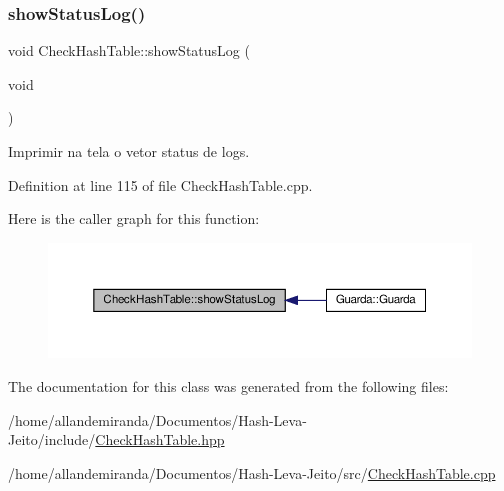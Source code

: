 \subsubsection{\texorpdfstring{show\+Status\+Log()}{showStatusLog()}}
{\footnotesize\ttfamily void Check\+Hash\+Table\+::show\+Status\+Log (\begin{DoxyParamCaption}\item[{void}]{ }\end{DoxyParamCaption})}



Imprimir na tela o vetor status de logs. 



Definition at line 115 of file Check\+Hash\+Table.\+cpp.

Here is the caller graph for this function\+:
\nopagebreak
\begin{figure}[H]
\begin{center}
\leavevmode
\includegraphics[width=350pt]{dc/d2a/class_check_hash_table_a976b114162765decaa1c7fe0b8e16cf8_icgraph}
\end{center}
\end{figure}


The documentation for this class was generated from the following files\+:\begin{DoxyCompactItemize}
\item 
/home/allandemiranda/\+Documentos/\+Hash-\/\+Leva-\/\+Jeito/include/\hyperlink{_check_hash_table_8hpp}{Check\+Hash\+Table.\+hpp}\item 
/home/allandemiranda/\+Documentos/\+Hash-\/\+Leva-\/\+Jeito/src/\hyperlink{_check_hash_table_8cpp}{Check\+Hash\+Table.\+cpp}\end{DoxyCompactItemize}
